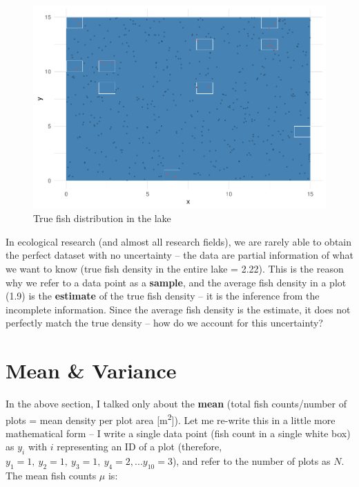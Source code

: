 \documentclass[
]{book}
\begin{document}
\begin{figure}

{\centering \includegraphics{_main_files/figure-latex/fish-plot-2-1} 

}

\caption{True fish distribution in the lake}\label{fig:fish-plot-2}
\end{figure}

In ecological research (and almost all research fields), we are rarely able to obtain the perfect dataset with no uncertainty -- the data are partial information of what we want to know (true fish density in the entire lake = 2.22). This is the reason why we refer to a data point as a \textbf{sample}, and the average fish density in a plot (1.9) is the \textbf{estimate} of the true fish density -- it is the inference from the incomplete information. Since the average fish density is the estimate, it does not perfectly match the true density -- how do we account for this uncertainty?

\hypertarget{mean-variance}{%
\section{Mean \& Variance}\label{mean-variance}}

In the above section, I talked only about the \textbf{mean} (total fish counts/number of plots = mean density per plot area {[}m\textsuperscript{2}{]}). Let me re-write this in a little more mathematical form -- I write a single data point (fish count in a single white box) as \(y_i\) with \(i\) representing an ID of a plot (therefore, \(y_1 = 1,~y_2 = 1,~y_3 = 1,~y_4 = 2, ...y_{10}=3\)), and refer to the number of plots as \(N\). The mean fish counts \(\mu\) is:
\end{document}
